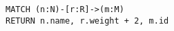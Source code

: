 \documentclass{article}
\begin{document}
\begin{lstlisting}[language=cypher, label=lst:cypher-example, caption=Example Cypher query]
MATCH (n:N)-[r:R]->(m:M)
RETURN n.name, r.weight + 2, m.id
\end{lstlisting}
\end{document}
